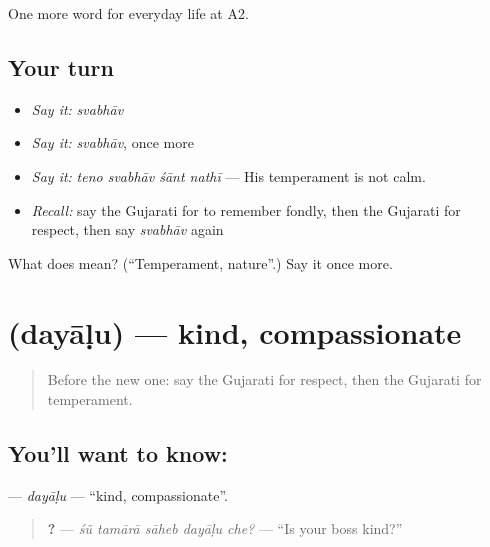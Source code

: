\begin{grammarlens}[title={What you've built}]
One more word for everyday life at A2.
\end{grammarlens}

\subsection*{Your turn}
\begin{itemize}
\raggedright
  \item \emph{Say it:} \emph{svabhāv}
  \item \emph{Say it:} \emph{svabhāv}, once more
  \item \emph{Say it:} \emph{teno svabhāv śānt nathī} — His temperament is not calm.
  \item \emph{Recall:} say the Gujarati for to remember fondly, then the Gujarati for respect, then say \emph{svabhāv} again
\end{itemize}

\begin{tcolorbox}[breakable,colback=teal!4,colframe=teal!35!black,title={Before you move on}]
What does  mean? (\textquotedblleft{}Temperament, nature\textquotedblright{}.) Say it once more.
\end{tcolorbox}
\section[\texorpdfstring{\gu{દયાળુ} (dayāḷu)}{દયાળુ (dayāḷu)}]{ (dayāḷu) — kind, compassionate}

\label{lesson:GU-C270-dayalu}



\begin{quote}
Before the new one: say the Gujarati for respect, then the Gujarati for temperament.
\end{quote}

\subsection*{You'll want to know: }
\textbf{} — \emph{dayāḷu} — \textquotedblleft{}kind, compassionate\textquotedblright{}.

\begin{quote}
\textbf{    ?} — \emph{śũ tamārā sāheb dayāḷu che?} — \textquotedblleft{}Is your boss kind?\textquotedblright{}
\end{quote}

